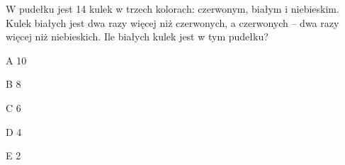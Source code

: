\begin{tresc}
W pudełku jest 14 kulek w trzech kolorach: czerwonym, białym i niebieskim. Kulek białych jest dwa razy więcej niż czerwonych, a czerwonych – dwa razy więcej niż niebieskich. Ile białych kulek jest w tym pudełku?
\end{tresc}
\begin{wariant}{A} 10 \end{wariant}
\begin{wariant}{B} 8 \end{wariant}
\begin{wariant}{C} 6 \end{wariant}
\begin{wariant}{D} 4 \end{wariant}
\begin{wariant}{E} 2 \end{wariant}
